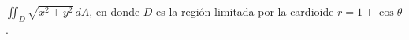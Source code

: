 \item $\iint_D \sqrt{x^2 + y^2} \, dA$, en donde $D$ es la región limitada por la cardioide $r = 1 + \cos \theta$.
